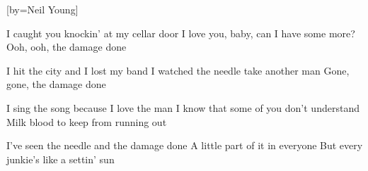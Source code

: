  

[by=Neil Young]




\beginverse
I caught you knockin' at my cellar door
I love you, baby, can I have some more?
Ooh, ooh, the damage done

I hit the city and I lost my band
I watched the needle take another man
Gone, gone, the damage done
\endverse

\beginverse
I sing the song because I love the man
I know that some of you don't understand
Milk blood to keep from running out

I've seen the needle and the damage done
A little part of it in everyone
But every junkie's like a settin' sun
\endverse

\endsong
